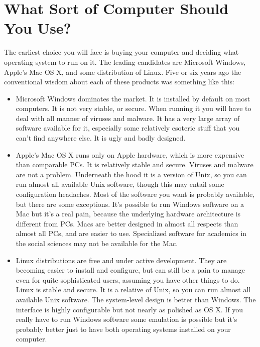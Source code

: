 \documentclass[11pt,article,oneside]{memoir}
\begin{document}
\section{What Sort of Computer Should You Use?}

The earliest choice you will face is buying your computer and deciding what operating system to run on it. The leading candidates are Microsoft Windows, Apple's Mac OS X, and some distribution of Linux. Five or six years ago the conventional wisdom about each of these products was something like this:  
                                                                                      
\begin{itemize}
	\item Microsoft Windows dominates the market. It is installed by default on most computers. It is not very stable, or secure. When running it you will have to deal with all manner of viruses and malware. It has a very large array of software available for it, especially some relatively esoteric stuff that you can't find anywhere else. It is ugly and badly designed. 
	\item Apple's Mac OS X runs only on Apple hardware, which is more expensive than comparable PCs. It is relatively stable and secure. Viruses and malware are not a problem. Underneath the hood it is a version of Unix, so you can run almost all available Unix software, though this may entail some configuration headaches. Most of the software you want is probably available, but there are some exceptions. It's possible to run Windows software on a Mac but it's a real pain, because the underlying hardware architecture is different from PCs. Macs are better designed in almost all respects than almost all PCs, and are easier to use. Specialized software for academics in the social sciences may not be available for the Mac. 
	\item Linux distributions are free and under active development. They are becoming easier to install and configure, but can still be a pain to manage even for quite sophisticated users, assuming you have other things to do. Linux is stable and secure. It is a relative of Unix, so you can run almost all available Unix software. The system-level design is better than Windows. The interface is highly configurable but not nearly as polished as OS X. If you really have to run Windows software some emulation is possible but it's probably better just to have both operating systems installed on your computer. 
\end{itemize}
\end{document}
